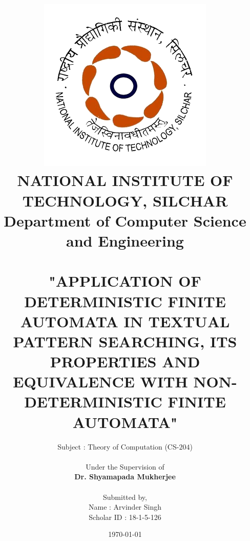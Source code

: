 \documentclass[12pt,a4paper]{article}%
\begin{document}
	
	
	\begin{titlepage}
	\title{\includegraphics[width=0.38 \textwidth]{./NIT_Silchar_logo.png}\\\textbf{\large NATIONAL INSTITUTE OF TECHNOLOGY, SILCHAR}\\\textbf{{\large Department of Computer Science and Engineering}}\\\\\bigskip\textbf{{\normalsize "APPLICATION OF DETERMINISTIC FINITE AUTOMATA IN TEXTUAL PATTERN SEARCHING, ITS PROPERTIES AND EQUIVALENCE WITH NON-DETERMINISTIC FINITE AUTOMATA" }}}
	\author{Subject : Theory of Computation (CS-$204$)\\\\ Under the Supervision of\\\textbf{Dr. Shyamapada Mukherjee} \\\\ Submitted by,\\Name : Arvinder Singh\\Scholar ID : 18-1-5-126}
	\date{\today}
	\clearpage\maketitle
	\thispagestyle{empty}
	\end{titlepage}
	
\end{document}
